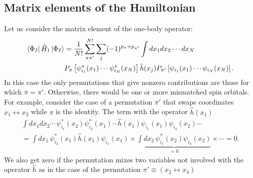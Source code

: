 \documentclass[../Main/chem532-notes.tex]{subfiles}
\begin{document}
\subsection{Matrix elements of the Hamiltonian}
Let us consider the matrix element of the one-body operator:
\begin{equation}
\begin{split}
\bra{\Phi_I} \hat{H}_1 \ket{\Phi_I} &= \frac{1}{N!}
\sum_{\pi \pi'}^{N!} \sum_j (-1)^{p_\pi + p_{\pi'}} \int dx_1 dx_2 \cdots dx_N \\
&
P_{\pi}\left[
\psi_{i_1}^{*}(x_1) \cdots \psi_{i_N}^{*}(x_N)
\right]
\hat{h}(x_j)
P_{\pi'}\left[
\psi_{i_1}(x_1) \cdots \psi_{i_N}(x_N)
\right].
\end{split}
\end{equation}
In this case the only permutations that give nonzero contributions are those for which $\pi = \pi'$.
Otherwise, there would be one or more mismatched spin orbitals. For example, consider the case of a permutation $\pi'$ that swaps coordinates $x_1 \leftrightarrow x_2$ while $\pi$ is the identity. The term with the operator $\hat{h}(x_1)$
\begin{equation}
\begin{split}
\int dx_1 dx_2 \cdots \,
\psi_{i_1}^{*}(x_2) \psi_{i_2}^{*}(x_1) \cdots
\hat{h}(x_1)
\psi_{i_1}(x_1) \psi_{i_2}(x_2)\cdots  \\
= \int dx_1 \, \psi_{i_2}^{*}(x_1) \hat{h}(x_1) \psi_{i_1}(x_1)
\times \underbrace{\int dx_2 \, \psi_{i_1}^{*}(x_2) \psi_{i_2}(x_2)}_{= 0} \times \cdots = 0.
\end{split}
\end{equation}
We also get zero if the permutation mixes two variables not involved with the operator $\hat{h}$ as in the case of the permutation $\pi' \equiv (x_2 \leftrightarrow x_3)$ 
\end{document}
